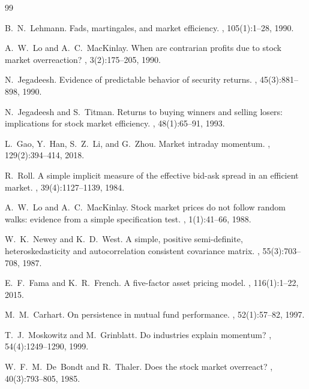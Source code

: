 \documentclass[10pt,conference,compsoc]{IEEEtran}
\begin{document}

\begin{thebibliography}{99}

B.~N.~Lehmann.
\newblock Fads, martingales, and market efficiency.
, 105(1):1--28, 1990.

A.~W.~Lo and A.~C.~MacKinlay.
\newblock When are contrarian profits due to stock market overreaction?
, 3(2):175--205, 1990.

N.~Jegadeesh.
\newblock Evidence of predictable behavior of security returns.
, 45(3):881--898, 1990.

N.~Jegadeesh and S.~Titman.
\newblock Returns to buying winners and selling losers: implications
  for stock market efficiency.
, 48(1):65--91, 1993.

L.~Gao, Y.~Han, S.~Z.~Li, and G.~Zhou.
\newblock Market intraday momentum.
, 129(2):394--414, 2018.

R.~Roll.
\newblock A simple implicit measure of the effective bid-ask spread
  in an efficient market.
, 39(4):1127--1139, 1984.

A.~W.~Lo and A.~C.~MacKinlay.
\newblock Stock market prices do not follow random walks: evidence
  from a simple specification test.
, 1(1):41--66, 1988.

W.~K.~Newey and K.~D.~West.
\newblock A simple, positive semi-definite, heteroskedasticity and
  autocorrelation consistent covariance matrix.
, 55(3):703--708, 1987.

E.~F.~Fama and K.~R.~French.
\newblock A five-factor asset pricing model.
, 116(1):1--22, 2015.

M.~M.~Carhart.
\newblock On persistence in mutual fund performance.
, 52(1):57--82, 1997.

T.~J.~Moskowitz and M.~Grinblatt.
\newblock Do industries explain momentum?
, 54(4):1249--1290, 1999.

W.~F.~M.~De~Bondt and R.~Thaler.
\newblock Does the stock market overreact?
, 40(3):793--805, 1985.


\end{thebibliography}
\end{document}
